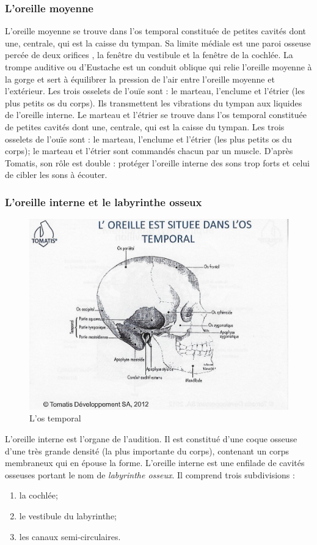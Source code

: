 \subsubsection{L'oreille moyenne}

L'oreille moyenne se trouve dans l'os temporal constituée de petites
cavités dont une, centrale, qui est la caisse du tympan. Sa limite
médiale est une paroi osseuse percée de deux orifices , la fenêtre
du vestibule et la fenêtre de la cochlée. La trompe auditive ou d'Eustache
est un conduit oblique qui relie l'oreille moyenne à la gorge et sert
à équilibrer la pression de l'air entre l'oreille moyenne et l'extérieur.
Les trois osselets de l'ouïe sont : le marteau, l'enclume et l'étrier
(les plus petits os du corps). Ils transmettent les vibrations du
tympan aux liquides de l'oreille interne. Le marteau et l'étrier se
trouve dans l'os temporal constituée de petites cavités dont une,
centrale, qui est la caisse du tympan. Les trois osselets de l'ouïe
sont : le marteau, l'enclume et l'étrier (les plus petits os du corps);
le marteau et l'étrier sont commandés chacun par un muscle. D'après
Tomatis, son rôle est double : protéger l'oreille interne des sons
trop forts et celui de cibler les sons à écouter.

\subsubsection{L'oreille interne et le labyrinthe osseux}

\begin{figure}
	\centering
	\includegraphics[width=0.7\linewidth]{images/Loreilleostemporal_crane.jpg}
	\caption[L'os temporal]{L'os temporal}
	\label{fig:loreilleostemporal18}
\end{figure}

L'oreille interne est l'organe de l'audition. Il
est constitué d'une coque osseuse d'une très grande densité (la plus
importante du corps), contenant un corps membraneux qui en épouse
la forme. 
L'oreille interne est une enfilade de cavités osseuses portant 
le nom de \emph{labyrinthe osseux}. Il comprend trois subdivisions : 
\begin{enumerate}
	\item la cochlée;
	\item le vestibule du labyrinthe;
	\item  les canaux semi-circulaires.
\end{enumerate}

